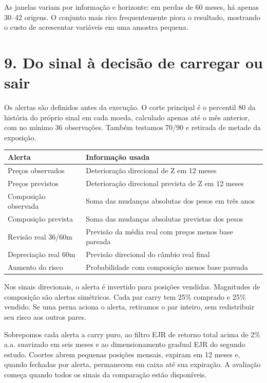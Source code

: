 \documentclass[11pt,a4paper]{article}
\begin{document}
As janelas variam por informação e horizonte: em perdas de 60 meses, há apenas 30--42 origens. O conjunto mais rico frequentemente piora o resultado, mostrando o custo de acrescentar variáveis em uma amostra pequena.

\clearpage
\section*{9. Do sinal à decisão de carregar ou sair}

Os alertas são definidos antes da execução. O corte principal é o percentil 80 da história do próprio sinal em cada moeda, calculado apenas até o mês anterior, com no mínimo 36 observações. Também testamos 70/90 e retirada de metade da exposição.
\footnotesize\begin{center}\begin{tabular}{ll}\toprule Alerta & Informação usada\\\midrule 
Preços observados & Deterioração direcional de Z em 12 meses\\
Preços previstos & Deterioração direcional prevista de Z em 12 meses\\
Composição observada & Soma das mudanças absolutas dos pesos em três anos\\
Composição prevista & Soma das mudanças absolutas previstas dos pesos\\
Revisão real 36/60m & Previsão da média real com preços menos base pareada\\
Depreciação real 60m & Previsão direcional do câmbio real final\\
Aumento do risco & Probabilidade com composição menos base pareada\\\bottomrule\end{tabular}\end{center}\normalsize

Nos sinais direcionais, o alerta é invertido para posições vendidas. Magnitudes de composição são alertas simétricos. Cada par carry tem 25\% comprado e 25\% vendido. Se uma perna aciona o alerta, retiramos o par inteiro, sem redistribuir seu risco aos outros pares.

Sobrepomos cada alerta a carry puro, ao filtro EJR de retorno total acima de 2\% a.a. suavizado em seis meses e ao dimensionamento gradual EJR do segundo estudo. Coortes abrem pequenas posições mensais, expiram em 12 meses e, quando fechadas por alerta, permanecem em caixa até sua expiração. A avaliação começa quando todos os sinais da comparação estão disponíveis.
\end{document}
